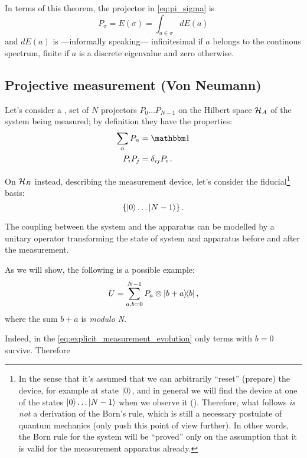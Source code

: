 In terms of this theorem, the projector in \eqref{eq:pi_sigma} is
\begin{equation}\label{eq:P_sigma_spectral}
  P_{\sigma} = E(\sigma) = \int_{a\in\sigma}dE(a)
\end{equation}
and $dE(a)$ is
---informally speaking---
infinitesimal if $a$ belongs to the continous spectrum,
finite if $a$ is a discrete eigenvalue
and zero otherwise.


\subsection{Projective measurement (Von Neumann)}

Let's consider a ,  set of $N$ projectors
$P_0 \dots P_{N-1}$ on the Hilbert space $\mathcal{H}_A$
of the system being measured;
by definition they have the properties:
\begin{align}
  \sum_n P_n  &= \idop \\
  P_i P_j     &= \delta_{ij}P_i \, \text{.}
\end{align}

On $\mathcal{H}_B$ instead, describing the measurement device, let's consider
the fiducial\footnote{
  In the sense that it's assumed
  that we can arbitrarily ``reset'' (prepare) the device,
  for example at state $\ket{0}$,
  and in general
  we will find the device at one of the states
  $\ket{0}\dots\ket{N-1}$
  when we observe it ().
  Therefore, what follows \emph{is not} a derivation of the Born's rule,
  which is still a necessary postulate of quantum mechanics
  (only \cite{Zurek_Decoherence, Zurek_Einselect, Zurek_Fundamentals} push
  this point of view further). In other words, the Born rule for the system
  will be ``proved''
  only on the assumption that it is valid for the measurement apparatus already.
}
basis:
\[
  \left\{\ket{0} \dots \ket{N-1}\right\} \text{.}
\]

The coupling between the system and the apparatus
can be modelled by
a unitary operator
transforming the state of system and apparatus before and after the measurement.

As we will show, the following is a possible example:
\begin{equation}\label{eq:unitary_measurement}
  U = \sum_{a, b = 0}^{N-1} P_a \otimes \ketbra{b+a}{b} \text{,}
\end{equation}
where the sum $b+a$ is \emph{modulo N}.

Indeed, in the \ref{eq:explicit_measurement_evolution} only terms with $b=0$ survive.
Therefore


